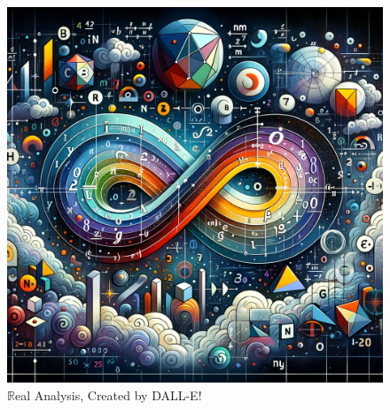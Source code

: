 \documentclass[10pt]{book}
\begin{document}

\begin{figure}[h!]
	\centering
	\includegraphics[width=1\linewidth]{Images/realAnalysis}
	\caption*{$\mathbb{R}$eal Analysis, Created by DALL-E!}
	\label{fig:realanalysis}
\end{figure}




\tableofcontents


\newpage

\newpage

\newpage

\end{document}
